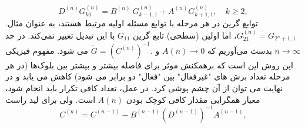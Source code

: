 \begin{equation}
	{{D}^{(n)}}G_{k1}^{(n)}={{B}^{(n)}}\ G_{k-1,1}^{(n)}+{{A}^{(n)}}G_{k+1,1}^{(n)},\quad k\ge 2,
\end{equation}
توابع گرین در هر مرحله با توابع مسئله اولیه مرتبط هستند، به عنوان مثال. $G_{21}^{(n)}={{G}_{{{2}^{n}}+1,1}}$، اما اولین (سطحی) تابع گرین $G_{11}$ با این تبدیل تغییر نمی‌کند.
در حد $n\to\infty$ بدست می‌آوریم که $A(n) \rightarrow 0$ و $\tilde{G}={{\left( {{C}^{(n)}} \right)}^{-1}}.$ می شود. مفهوم فیزیکی این روش این است که برهمکنش موثر برای فاصله بیشتر و بیشتر بین بلوک‌ها (در هر مرحله تعداد برش های "غیرفعال" بین "فعال" دو برابر می شود) کاهش می یابد و در نهایت می توان از آن چشم پوشی کرد. در عمل، تعداد کافی تکرار باید انجام شود، معیار همگرایی مقدار کافی کوچک بودن $A(n)$ است.
ولی برای لید راست 
\begin{equation}
    {{C}^{(n)}}={{C}^{(n-1)}}-{{B}^{(n-1)}}{{({{D}^{(n-1)}})}^{-1}}{{A}^{(n-1)}},
\end{equation}